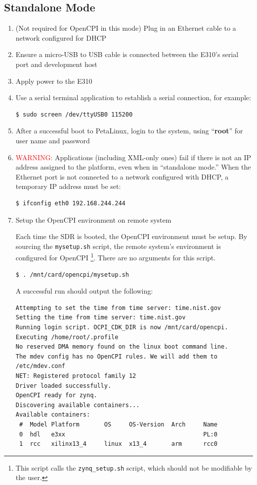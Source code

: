 \pagebreak
\subsection{Standalone Mode}
\begin{enumerate}
\item (Not required for OpenCPI in this mode) Plug in an Ethernet cable to a network configured for DHCP
\item Ensure a micro-USB to USB cable is connected between the E310's serial port and development host
\item Apply power to the E310
\item Use a serial terminal application to establish a serial connection, for example:

\begin{verbatim}
$ sudo screen /dev/ttyUSB0 115200
\end{verbatim}

\item After a successful boot to PetaLinux, login to the system, using  ``\textbf{root}'' for user name and password

\item \textcolor{red}{WARNING:}
Applications (including XML-only ones) fail if there is not an IP address assigned to the platform, even when in ``standalone mode.'' When the Ethernet port is not connected to a network configured with DHCP, a temporary IP address must be set:
\begin{verbatim}
$ ifconfig eth0 192.168.244.244
\end{verbatim} \medskip

\item Setup the OpenCPI environment on remote system

\begin{flushleft}
Each time the SDR is booted, the OpenCPI environment must be setup. By sourcing the \texttt{mysetup.sh} script, the remote system's environment is configured for OpenCPI \footnote{This script calls the \texttt{zynq\_setup.sh} script, which should not be modifiable by the user.}. There are no arguments for this script.
\begin{verbatim}
$ . /mnt/card/opencpi/mysetup.sh
\end{verbatim}

A successful run should output the following:
\begin{verbatim}
Attempting to set the time from time server: time.nist.gov
Setting the time from time server: time.nist.gov
Running login script. OCPI_CDK_DIR is now /mnt/card/opencpi.
Executing /home/root/.profile
No reserved DMA memory found on the linux boot command line.
The mdev config has no OpenCPI rules. We will add them to /etc/mdev.conf
NET: Registered protocol family 12
Driver loaded successfully.
OpenCPI ready for zynq.
Discovering available containers...
Available containers:
 #  Model Platform       OS     OS-Version  Arch     Name
 0  hdl   e3xx                                       PL:0
 1  rcc   xilinx13_4     linux  x13_4       arm      rcc0
\end{verbatim}

\end{flushleft}
\end{enumerate}

